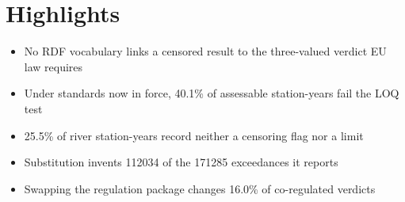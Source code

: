 \documentclass[preprint,review,12pt,authoryear]{elsarticle}
\newenvironment{highlights}
    {\section*{Highlights}\begin{itemize}\setlength{\itemsep}{0pt}}
    {\end{itemize}}%
\begin{document}
\begin{highlights}
\item No RDF vocabulary links a censored result to the three-valued verdict EU law requires
\item Under standards now in force, \num{40.1}\% of assessable station-years fail the LOQ test
\item \num{25.5}\% of river station-years record neither a censoring flag nor a limit
\item Substitution invents \num{112034} of the \num{171285} exceedances it reports
\item Swapping the regulation package changes \num{16.0}\% of co-regulated verdicts
\end{highlights}


\end{document}
